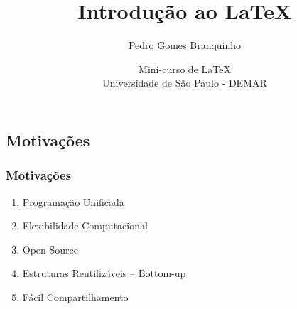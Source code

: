 \documentclass{beamer}
\title{\Huge{Introdução ao \LaTeX}}
\author[Branquinho]{Pedro Gomes Branquinho \\
    \text{\scriptsize{pedro.branquinho@usp.br}}}
\date{\scriptsize{Mini-curso de \LaTeX} \\ Universidade de São Paulo - DEMAR}
\begin{document}
{
\begin{frame}
  \titlepage
\end{frame}
}

\begin{frame}
  \section{Motivações}
  \frametitle{Motivações}

  \begin{enumerate}
  \item<1->{Programação Unificada}
  \item<5->{Flexibilidade Computacional}
  \item<2->{Open Source}
  \item<3->{Estruturas Reutilizáveis -- Bottom-up}
  \item<4->{Fácil Compartilhamento}
  \end{enumerate}


\end{frame}
\end{document}
